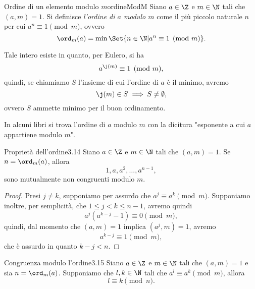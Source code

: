\begin{defn}{Ordine di un elemento modulo \(m\)}{ordineModM}
	Siano \(a\in\Z\) e \(m\in\N\) tali che \((a,m)=1\).
	Si definisce \emph{l'ordine di \(a\) modulo \(m\)} come il più piccolo naturale \(n\) per cui \(a^n\equiv 1 \pmod{m}\), ovvero
	\[
		\ord_m(a) = \min \Set{n\in\N | a^n \equiv 1 \pmod{m}}.
	\]
\end{defn}

\begin{oss}
	Tale intero esiste in quanto, per Eulero, si ha
	\[
		a^{\j(m)} \equiv 1 \pmod{m},
	\]
	quindi, se chiamiamo \(S\) l'insieme di cui l'ordine di \(a\) è il minimo, avremo
	\[
		\j(m) \in S \implies S \neq \emptyset,
	\]
	ovvero \(S\) ammette minimo per il buon ordinamento.
\end{oss}

\begin{notz}
	In alcuni libri si trova l'ordine di \(a\) modulo \(m\) con la dicitura "esponente a cui \(a\) appartiene modulo \(m\)".
\end{notz}

\begin{teor}{Proprietà dell'ordine}{3.14}
	Siano \(a\in\Z\) e \(m\in\N\) tali che \((a,m) = 1\).
	Se \(n = \ord_m(a)\), allora
	\[
		1,a,a^2,\ldots,a^{n-1},
	\]
	sono mutualmente non congruenti modulo \(m\).
\end{teor}

\begin{proof}
	Presi \(j\neq k\), supponiamo per assurdo che \(a^j \equiv a^k \pmod{m}\).
	Supponiamo inoltre, per semplicità, che \(1\le j < k \le n-1\), avremo quindi
	\[
		a^j (a^{k-j}-1) \equiv 0 \pmod{m},
	\]
	quindi, dal momento che \((a,m) = 1\) implica \((a^j,m) = 1\), avremo
	\[
		a^{k-j} \equiv 1 \pmod{m},
	\]
	che è assurdo in quanto \(k-j<n\).
\end{proof}

\begin{teor}{Congruenza modulo l'ordine}{3.15}
	Siano \(a\in\Z\) e \(m\in\N\) tali che \((a,m)=1\) e sia \(n=\ord_m(a)\).
	Supponiamo che \(l,k\in\N\) tali che \(a^l \equiv a^k \pmod{m}\), allora
	\[
		l \equiv k \pmod{n}.
	\]
\end{teor}

